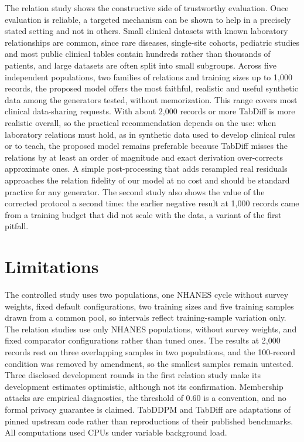 \documentclass[conference]{IEEEtran}
\begin{document}
The relation study shows the constructive side of trustworthy evaluation. Once evaluation is reliable, a targeted mechanism can be shown to help in a precisely stated setting and not in others. Small clinical datasets with known laboratory relationships are common, since rare diseases, single-site cohorts, pediatric studies and most public clinical tables contain hundreds rather than thousands of patients, and large datasets are often split into small subgroups. Across five independent populations, two families of relations and training sizes up to 1,000 records, the proposed model offers the most faithful, realistic and useful synthetic data among the generators tested, without memorization. This range covers most clinical data-sharing requests. With about 2,000 records or more TabDiff is more realistic overall, so the practical recommendation depends on the use: when laboratory relations must hold, as in synthetic data used to develop clinical rules or to teach, the proposed model remains preferable because TabDiff misses the relations by at least an order of magnitude and exact derivation over-corrects approximate ones. A simple post-processing that adds resampled real residuals approaches the relation fidelity of our model at no cost and should be standard practice for any generator. The second study also shows the value of the corrected protocol a second time: the earlier negative result at 1,000 records came from a training budget that did not scale with the data, a variant of the first pitfall.

\section{Limitations}

The controlled study uses two populations, one NHANES cycle without survey weights, fixed default configurations, two training sizes and five training samples drawn from a common pool, so intervals reflect training-sample variation only. The relation studies use only NHANES populations, without survey weights, and fixed comparator configurations rather than tuned ones. The results at 2,000 records rest on three overlapping samples in two populations, and the 100-record condition was removed by amendment, so the smallest samples remain untested. Three disclosed development rounds in the first relation study make its development estimates optimistic, although not its confirmation. Membership attacks are empirical diagnostics, the threshold of 0.60 is a convention, and no formal privacy guarantee is claimed. TabDDPM and TabDiff are adaptations of pinned upstream code rather than reproductions of their published benchmarks. All computations used CPUs under variable background load.
\end{document}
